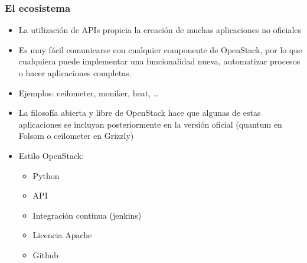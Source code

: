 \documentclass{beamer}
\begin{document}
\begin{frame}
  \frametitle{El ecosistema}
  \begin{itemize}
  \item La utilización de APIs propicia la creación de muchas aplicaciones no
    oficiales
  \item Es muy fácil comunicarse con cualquier componente de OpenStack, por lo
    que cualquiera puede implementar una funcionalidad nueva, automatizar
    procesos o hacer aplicaciones completas.
  \item Ejemplos: ceilometer, moniker, heat, \ldots
  \item La filosofía abierta y libre de OpenStack hace que algunas de estas
    aplicaciones se incluyan posteriormente en la versión oficial
    (quantum en Folsom o ceilometer en Grizzly)
  \item Estilo OpenStack:
    \begin{itemize}
    \item Python
    \item API
    \item Integración continua (jenkins)
    \item Licencia Apache
    \item Github
    \end{itemize}
  \end{itemize}
\end{frame}
\end{document}
